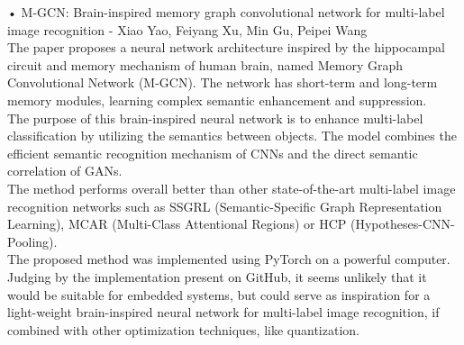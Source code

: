 \documentclass[11pt, a4paper, oneside, pdftex]{research_paper}
\begin{document}
\hspace{20mm}•\hspace{3mm}	M-GCN: Brain-inspired memory graph convolutional network for multi-label image recognition - Xiao Yao, Feiyang Xu, Min Gu, Peipei Wang \\
\null \hspace{30mm}	The paper proposes a neural network architecture inspired by the hippocampal circuit and memory mechanism of human brain, named Memory Graph Convolutional Network (M-GCN). The network has short-term and long-term memory modules, learning complex semantic enhancement and suppression. \\
\null \hspace{30mm}	The purpose of this brain-inspired neural network is to enhance multi-label classification by utilizing the semantics between objects. The model combines the efficient semantic recognition mechanism of CNNs and the direct semantic correlation of GANs. \\
\null \hspace{30mm}	The method performs overall better than other state-of-the-art multi-label image recognition networks such as SSGRL (Semantic-Specific Graph Representation Learning), MCAR (Multi-Class Attentional Regions) or HCP (Hypotheses-CNN-Pooling). \\
\null \hspace{30mm}	The proposed method was implemented using PyTorch on a powerful computer. Judging by the implementation present on GitHub, it seems unlikely that it would be suitable for embedded systems, but could serve as inspiration for a light-weight brain-inspired neural network for multi-label image recognition, if combined with other optimization techniques, like quantization. \\
\end{document}
